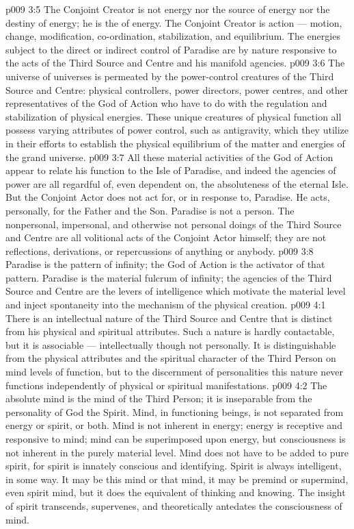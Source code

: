 \vs p009 3:5 \pc The Conjoint Creator is not energy nor the source of energy nor the destiny of energy; he is the  of energy. The Conjoint Creator is action --- motion, change, modification, co\hyp{}ordination, stabilization, and equilibrium. The energies subject to the direct or indirect control of Paradise are by nature responsive to the acts of the Third Source and Centre and his manifold agencies.
\vs p009 3:6 The universe of universes is permeated by the power\hyp{}control creatures of the Third Source and Centre: physical controllers, power directors, power centres, and other representatives of the God of Action who have to do with the regulation and stabilization of physical energies. These unique creatures of physical function all possess varying attributes of power control, such as antigravity, which they utilize in their efforts to establish the physical equilibrium of the matter and energies of the grand universe.
\vs p009 3:7 All these material activities of the God of Action appear to relate his function to the Isle of Paradise, and indeed the agencies of power are all regardful of, even dependent on, the absoluteness of the eternal Isle. But the Conjoint Actor does not act for, or in response to, Paradise. He acts, personally, for the Father and the Son. Paradise is not a person. The nonpersonal, impersonal, and otherwise not personal doings of the Third Source and Centre are all volitional acts of the Conjoint Actor himself; they are not reflections, derivations, or repercussions of anything or anybody.
\vs p009 3:8 Paradise is the pattern of infinity; the God of Action is the activator of that pattern. Paradise is the material fulcrum of infinity; the agencies of the Third Source and Centre are the levers of intelligence which motivate the material level and inject spontaneity into the mechanism of the physical creation.
\vs p009 4:1 There is an intellectual nature of the Third Source and Centre that is distinct from his physical and spiritual attributes. Such a nature is hardly contactable, but it is associable --- intellectually though not personally. It is distinguishable from the physical attributes and the spiritual character of the Third Person on mind levels of function, but to the discernment of personalities this nature never functions independently of physical or spiritual manifestations.
\vs p009 4:2 The absolute mind is the mind of the Third Person; it is inseparable from the personality of God the Spirit. Mind, in functioning beings, is not separated from energy or spirit, or both. Mind is not inherent in energy; energy is receptive and responsive to mind; mind can be superimposed upon energy, but consciousness is not inherent in the purely material level. Mind does not have to be added to pure spirit, for spirit is innately conscious and identifying. Spirit is always intelligent,  in some way. It may be this mind or that mind, it may be premind or supermind, even spirit mind, but it does the equivalent of thinking and knowing. The insight of spirit transcends, supervenes, and theoretically antedates the consciousness of mind.
